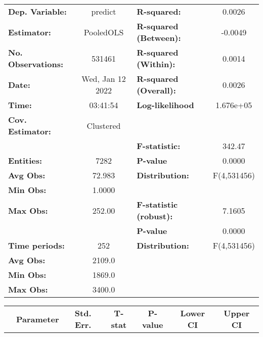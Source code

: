 \begin{center}
\begin{tabular}{lclc}
\toprule
\textbf{Dep. Variable:}    &      predict       & \textbf{  R-squared:         }   &      0.0026      \\
\textbf{Estimator:}        &     PooledOLS      & \textbf{  R-squared (Between):}  &     -0.0049      \\
\textbf{No. Observations:} &       531461       & \textbf{  R-squared (Within):}   &      0.0014      \\
\textbf{Date:}             &  Wed, Jan 12 2022  & \textbf{  R-squared (Overall):}  &      0.0026      \\
\textbf{Time:}             &      03:41:54      & \textbf{  Log-likelihood     }   &    1.676e+05     \\
\textbf{Cov. Estimator:}   &     Clustered      & \textbf{                     }   &                  \\
\textbf{}                  &                    & \textbf{  F-statistic:       }   &      342.47      \\
\textbf{Entities:}         &        7282        & \textbf{  P-value            }   &      0.0000      \\
\textbf{Avg Obs:}          &       72.983       & \textbf{  Distribution:      }   &   F(4,531456)    \\
\textbf{Min Obs:}          &       1.0000       & \textbf{                     }   &                  \\
\textbf{Max Obs:}          &       252.00       & \textbf{  F-statistic (robust):} &      7.1605      \\
\textbf{}                  &                    & \textbf{  P-value            }   &      0.0000      \\
\textbf{Time periods:}     &        252         & \textbf{  Distribution:      }   &   F(4,531456)    \\
\textbf{Avg Obs:}          &       2109.0       & \textbf{                     }   &                  \\
\textbf{Min Obs:}          &       1869.0       & \textbf{                     }   &                  \\
\textbf{Max Obs:}          &       3400.0       & \textbf{                     }   &                  \\
\bottomrule
\end{tabular}
\begin{tabular}{lcccccc}
                & \textbf{Parameter} & \textbf{Std. Err.} & \textbf{T-stat} & \textbf{P-value} & \textbf{Lower CI} & \textbf{Upper CI}  \\

\end{tabular}
\end{center}
